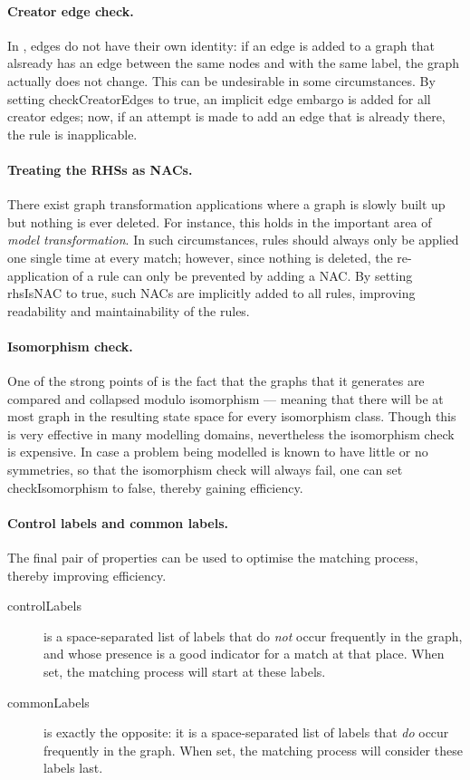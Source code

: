 \paragraph{Creator edge check.}

In \GROOVE, edges do not have their own identity: if an edge is added to a
graph that alsready has an edge between the same nodes and with the same label,
the graph actually does not change. This can be undesirable in some
circumstances. By setting \textsf{checkCreatorEdges} to \textsf{true}, an
implicit edge embargo is added for all creator edges; now, if an attempt is
made to add an edge that is already there, the rule is inapplicable.

\paragraph{Treating the RHSs as NACs.}

There exist graph transformation applications where a graph is slowly built up
but 
nothing is ever deleted. For instance, this holds in the important area of
\emph{model transformation}. In such circumstances, rules should always only
be applied one single time at every match; however, since nothing is deleted,
the re-application of a rule can only be prevented by adding a NAC. By setting
\textsf{rhsIsNAC} to \textsf{true}, such NACs are implicitly added to all
rules, improving readability and maintainability of the rules.

\paragraph{Isomorphism check.}

One of the strong points of \GROOVE{} is the fact that the graphs that it
generates are compared and collapsed modulo isomorphism --- meaning that there
will be at most graph in the resulting state space for every isomorphism
class. Though this is very effective in many modelling domains, nevertheless
the isomorphism check is expensive. In case a problem being modelled is known
to have little or no symmetries, so that the isomorphism check will always
fail, one can set \textsf{checkIsomorphism} to \textsf{false}, thereby gaining
efficiency.

\paragraph{Control labels and common labels.}

The final pair of properties can be used to optimise the matching process,
thereby improving efficiency.
%
\begin{description}
\item[\textsf{controlLabels}] is a space-separated list of labels that do
  \emph{not} occur frequently in the graph, and whose presence is a good
  indicator for a match at that place. When set, the matching process will
  start at these labels.
\item[\textsf{commonLabels}] is exactly the opposite: it is a space-separated
  list of labels that \emph{do} occur frequently in the graph. When set, the
  matching process will consider these labels last.
\end{description}

